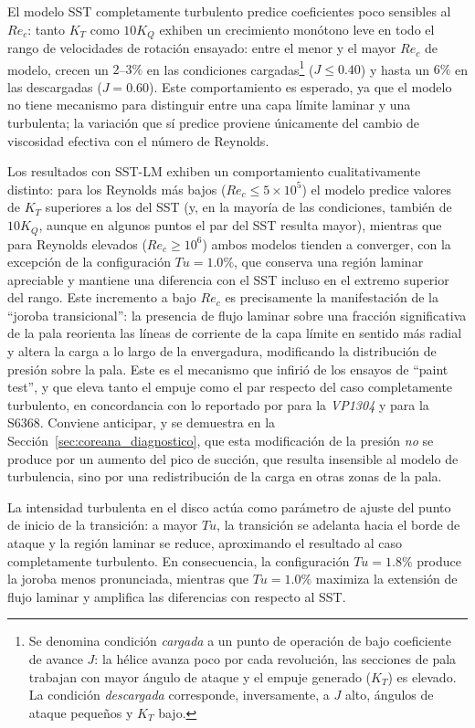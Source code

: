 El modelo SST completamente turbulento predice coeficientes poco sensibles al
$Re_c$: tanto $K_T$ como $10K_Q$ exhiben un crecimiento monótono leve en todo el rango
de velocidades de rotación ensayado: entre el menor y el mayor $Re_c$ de modelo, crecen un $2$--$3\%$ en las condiciones cargadas\footnote{Se denomina condición \emph{cargada} a un punto de operación de bajo coeficiente de avance $J$: la hélice avanza poco por cada revolución, las secciones de pala trabajan con mayor ángulo de ataque y el empuje generado ($K_T$) es elevado. La condición \emph{descargada} corresponde, inversamente, a $J$ alto, ángulos de ataque pequeños y $K_T$ bajo.} ($J\leq0.40$) y hasta un $6\%$ en las descargadas ($J=0.60$). Este comportamiento es esperado, ya que el modelo no tiene
mecanismo para distinguir entre una capa límite laminar y una turbulenta; la variación
que sí predice proviene únicamente del cambio de viscosidad efectiva con el número de
Reynolds.

Los resultados con SST-LM exhiben un comportamiento cualitativamente distinto: para
los Reynolds más bajos ($Re_c \leq 5 \times 10^5$) el modelo predice valores de
$K_T$ superiores a los del SST (y, en la mayoría de las condiciones, también de
$10K_Q$, aunque en algunos puntos el par del SST resulta mayor), mientras que para
Reynolds elevados ($Re_c \geq 10^6$) ambos modelos tienden a converger, con la
excepción de la configuración $Tu = 1.0\%$, que conserva una región laminar apreciable
y mantiene una diferencia con el SST incluso en el extremo superior del rango. Este
incremento a bajo $Re_c$ es precisamente la manifestación de la ``joroba
transicional'': la presencia de flujo laminar sobre una fracción significativa de la
pala reorienta las líneas de corriente de la capa límite en sentido más radial y
altera la carga a lo largo de la envergadura, modificando la distribución de presión
sobre la pala. Este es el mecanismo que \citet{rijpkema2015viscous} infirió de los
ensayos de ``paint test'', y que eleva tanto el empuje como el par respecto del caso
completamente turbulento, en concordancia con lo reportado por \citet{gaggero2021transition}
para la \textit{VP1304} y \citet{Baltazar2021} para la S6368. Conviene anticipar, y se demuestra en la Sección~\ref{sec:coreana_diagnostico}, que esta modificación de la
presión \emph{no} se produce por un aumento del pico de succión, que resulta
insensible al modelo de turbulencia, sino por una redistribución de la carga en otras
zonas de la pala.

La intensidad turbulenta en el disco actúa como parámetro de ajuste del punto de
inicio de la transición: a mayor $Tu$, la transición se adelanta hacia el borde de
ataque y la región laminar se reduce, aproximando el resultado al caso completamente
turbulento. En consecuencia, la configuración $Tu = 1.8\%$ produce la joroba menos
pronunciada, mientras que $Tu = 1.0\%$ maximiza la extensión de flujo laminar y
amplifica las diferencias con respecto al SST.

